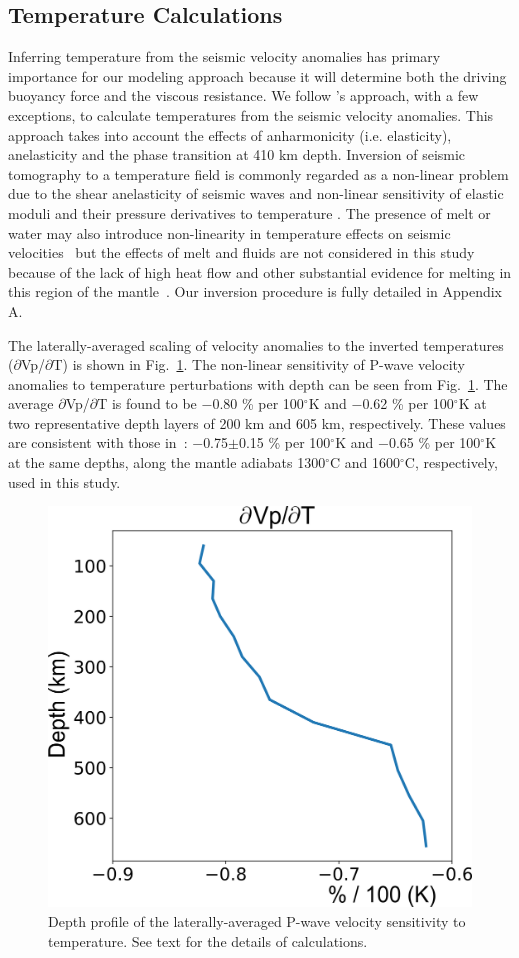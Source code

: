 \documentclass[draft,linenumbers]{agujournal2018}
\begin{document}
\subsection{Temperature Calculations} \label{temp_var}
    Inferring temperature from the seismic velocity anomalies has primary importance for our modeling approach because it will determine both the driving buoyancy force and the viscous resistance. We follow \citet{Cammarano2003}'s approach, with a few exceptions, to calculate temperatures from the seismic velocity anomalies. This approach takes into account the effects of anharmonicity (i.e. elasticity), anelasticity and the phase transition at 410 km depth. Inversion of seismic tomography to a temperature field is commonly regarded as a non-linear problem due to the shear anelasticity of seismic waves \citep{minster1981model, karato1993importance, sobolev1996upper, Goes_2000, artemieva2004shear} and non-linear sensitivity of elastic moduli and their pressure derivatives to temperature \citep{duffy1989seismic, anderson1992high, Cammarano2003, stixrude2005thermodynamics}. The presence of melt or water may also introduce non-linearity in temperature effects on seismic velocities~\citep{Karato_1998} but the effects of melt and fluids are not considered in this study because of the lack of high heat flow and other substantial evidence for melting in this region of the mantle~\citep{blackwell2006assessment}. Our inversion procedure is fully detailed in Appendix A.
    
The laterally-averaged scaling of velocity anomalies to the inverted temperatures ($\partial$Vp/$\partial$T) is shown in Fig.~\ref{fig_temp}. The non-linear sensitivity of P-wave velocity anomalies to temperature perturbations with depth can be seen from Fig.~\ref{fig_temp}. The average $\partial$Vp/$\partial$T is found to be $-$0.80 \% per 100$^\circ$K and $-$0.62 \% per 100$^\circ$K at two representative depth layers of 200 km and 605 km, respectively. These values are consistent with those in~\citet{Cammarano2003}: $-$0.75$\pm$0.15 \% per 100$^\circ$K and $-$0.65 \% per 100$^\circ$K at the same depths, along the mantle adiabats 1300$^{\circ}$C and 1600$^{\circ}$C, respectively, used in this study. 
%
\begin{figure}[ht]
    \centering
    \includegraphics[width=0.6\linewidth]{figures/depth_average.png}
    \caption{Depth profile of the laterally-averaged P-wave velocity sensitivity to temperature. See text for the details of calculations.}
    \label{fig_temp}
 \end{figure}
\end{document}
